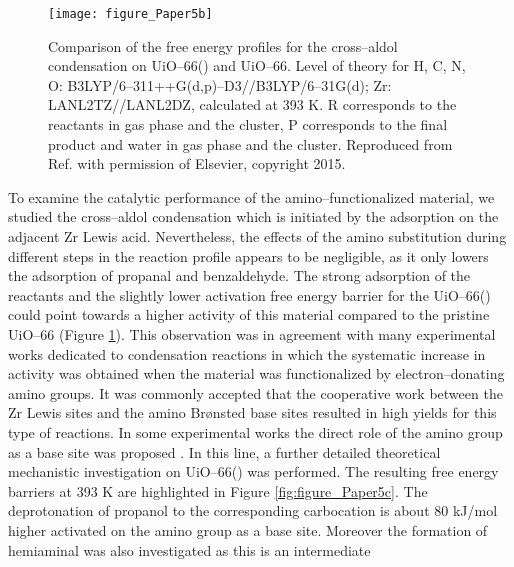\begin{figure}[!htp]
	\centering
	\texttt{[image: figure\_Paper5b]}
	\caption[Comparison of the free energy profiles for the cross--aldol
	condensation on UiO--66() and UiO--66. Level of theory for H, C, N, O: B3LYP/6--311++G(d,p)--D3//B3LYP/6--31G(d); Zr:
	LANL2TZ// LANL2DZ, calculated at 393 K. R
	corresponds to the reactants in gas phase and the cluster, P corresponds to the final
	product and water in gas phase and the cluster.] {Comparison of
	the free energy profiles for the cross--aldol condensation on UiO--66() and UiO--66.
	Level of theory for H, C, N, O: B3LYP/6--311++G(d,p)--D3//B3LYP/6--31G(d); Zr:
	LANL2TZ//LANL2DZ, calculated at 393 K. R
	corresponds to the reactants in gas phase and the cluster, P corresponds to the final
	product and water in gas phase and the cluster. Reproduced from Ref.
	\cite{Hajek2015} with permission of Elsevier, copyright 2015.}
	\label{fig:figure_Paper5b}
\end{figure}
\npar
To examine the catalytic performance of the amino--functionalized material, we
studied the cross--aldol condensation which is initiated by the
adsorption on the adjacent Zr Lewis acid.
Nevertheless, the effects of the amino substitution during different steps in the reaction profile appears to be
negligible, as it only lowers the adsorption of propanal and benzaldehyde. The
strong adsorption of the reactants and the slightly lower activation free energy
barrier for the UiO--66() could point towards a higher activity of this
material compared to the pristine UiO--66 (Figure \ref{fig:figure_Paper5b}).
This observation was in agreement with many experimental works dedicated to
condensation reactions in which the systematic increase in activity was obtained
when the material was functionalized by electron--donating amino groups. It was commonly accepted that the cooperative work between the Zr Lewis sites and the amino Br\o{}nsted base sites resulted in high yields for
this type of reactions. In some experimental works the direct role of the amino
group as a base site was proposed \cite{Timofeeva2014, Yang2014, Gascon2009,
Panchenko2014}. In this line, a further detailed theoretical mechanistic
investigation on UiO--66() was performed. The resulting free energy barriers at 393 K are highlighted in Figure \ref{fig:figure_Paper5c}. The
deprotonation of propanol to the corresponding carbocation is about 80 kJ/mol higher activated on the amino group as a base site. Moreover the
formation of hemiaminal was also investigated as this is an intermediate
